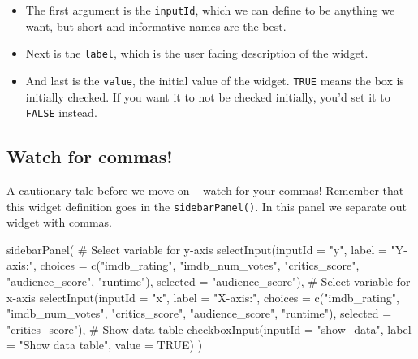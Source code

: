 \documentclass[
  letterpaper,
  DIV=11,
  numbers=noendperiod]{scrreprt}
\newenvironment{Shaded}{\begin{snugshade}}{\end{snugshade}}
\newcommand{\AttributeTok}[1]{\textcolor[rgb]{0.40,0.46,0.14}{#1}}
\newcommand{\CommentTok}[1]{\textcolor[rgb]{0.37,0.37,0.37}{#1}}
\newcommand{\ConstantTok}[1]{\textcolor[rgb]{0.56,0.35,0.01}{#1}}
\newcommand{\FunctionTok}[1]{\textcolor[rgb]{0.28,0.35,0.67}{#1}}
\newcommand{\NormalTok}[1]{\textcolor[rgb]{0.00,0.46,0.62}{#1}}
\newcommand{\StringTok}[1]{\textcolor[rgb]{0.13,0.47,0.30}{#1}}
\providecommand{\tightlist}{%
  \setlength{\itemsep}{0pt}\setlength{\parskip}{0pt}}
\begin{document}
\begin{itemize}
\tightlist
\item
  The first argument is the \texttt{inputId}, which we can define to be
  anything we want, but short and informative names are the best.
\item
  Next is the \texttt{label}, which is the user facing description of
  the widget.
\item
  And last is the \texttt{value}, the initial value of the widget.
  \texttt{TRUE} means the box is initially checked. If you want it to
  not be checked initially, you'd set it to \texttt{FALSE} instead.
\end{itemize}

\hypertarget{watch-for-commas}{%
\subsection{Watch for commas!}\label{watch-for-commas}}

A cautionary tale before we move on -- watch for your commas! Remember
that this widget definition goes in the \texttt{sidebarPanel()}. In this
panel we separate out widget with commas.

\begin{Shaded}
\begin{Highlighting}[]
\FunctionTok{sidebarPanel}\NormalTok{(}
    \CommentTok{\# Select variable for y{-}axis }
    \FunctionTok{selectInput}\NormalTok{(}\AttributeTok{inputId =} \StringTok{"y"}\NormalTok{, }\AttributeTok{label =} \StringTok{"Y{-}axis:"}\NormalTok{,}
                \AttributeTok{choices =} \FunctionTok{c}\NormalTok{(}\StringTok{"imdb\_rating"}\NormalTok{, }\StringTok{"imdb\_num\_votes"}\NormalTok{, }\StringTok{"critics\_score"}\NormalTok{, }\StringTok{"audience\_score"}\NormalTok{, }\StringTok{"runtime"}\NormalTok{),}
                \AttributeTok{selected =} \StringTok{"audience\_score"}\NormalTok{),  }
    \CommentTok{\# Select variable for x{-}axis}
    \FunctionTok{selectInput}\NormalTok{(}\AttributeTok{inputId =} \StringTok{"x"}\NormalTok{, }\AttributeTok{label =} \StringTok{"X{-}axis:"}\NormalTok{,}
                \AttributeTok{choices =} \FunctionTok{c}\NormalTok{(}\StringTok{"imdb\_rating"}\NormalTok{, }\StringTok{"imdb\_num\_votes"}\NormalTok{, }\StringTok{"critics\_score"}\NormalTok{,  }
\StringTok{"audience\_score"}\NormalTok{, }\StringTok{"runtime"}\NormalTok{),}
\AttributeTok{selected =} \StringTok{"critics\_score"}\NormalTok{),}
    \CommentTok{\# Show data table }
    \FunctionTok{checkboxInput}\NormalTok{(}\AttributeTok{inputId =} \StringTok{"show\_data"}\NormalTok{,}
                  \AttributeTok{label =} \StringTok{"Show data table"}\NormalTok{, }\AttributeTok{value =} \ConstantTok{TRUE}\NormalTok{)   }
\NormalTok{ )}
\end{Highlighting}
\end{Shaded}
\end{document}
